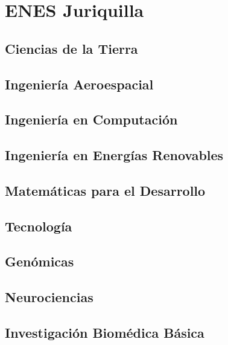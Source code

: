 \section{ENES Juriquilla}

\subsection{Ciencias de la Tierra}

\subsection{Ingeniería Aeroespacial}

\subsection{Ingeniería en Computación}

\subsection{Ingeniería en Energías Renovables}

\subsection{Matemáticas para el Desarrollo}

\subsection{Tecnología}

\subsection{Genómicas}

\subsection{Neurociencias}

\subsection{Investigación Biomédica Básica}

